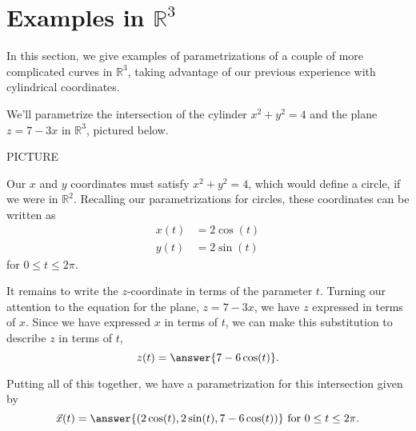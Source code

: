 \documentclass{ximera}
\begin{document}
\section{Examples in $\mathbb{R}^3$}

In this section, we give examples of parametrizations of a couple of more complicated curves in $\mathbb{R}^3$, taking advantage of our previous experience with cylindrical coordinates.

\begin{example}
We'll parametrize the intersection of the cylinder $x^2 + y^2 = 4$ and the plane $z = 7-3x$ in $\mathbb{R}^3$, pictured below.

PICTURE

Our $x$ and $y$ coordinates must satisfy $x^2 + y^2 = 4$, which would define a circle, if we were in $\mathbb{R}^2$. Recalling our parametrizations for circles, these coordinates can be written as
\begin{align*}
x(t) &= 2\cos(t)\\
y(t) &= 2\sin(t)
\end{align*}
for $0\leq t\leq 2\pi$.

It remains to write the $z$-coordinate in terms of the parameter $t$. Turning our attention to the equation for the plane, $z = 7-3x$, we have $z$ expressed in terms of $x$. Since we have expressed $x$ in terms of $t$, we can make this substitution to describe $z$ in terms of $t$,
\[
z(t) = \answer{7-6\cos(t)}.
\]

Putting all of this together, we have a parametrization for this intersection given by
\[
\vec{x}(t) = \answer{(2\cos(t),2\sin(t),7-6\cos(t))} \textrm{ for } 0\leq t\leq 2\pi.
\]

\end{example}
\end{document}
